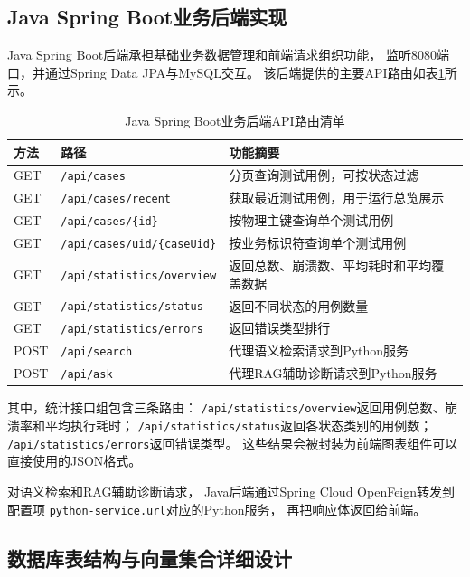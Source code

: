 \subsection{Java Spring Boot业务后端实现}

Java Spring Boot后端承担基础业务数据管理和前端请求组织功能，
监听8080端口，并通过Spring Data JPA与MySQL交互。
该后端提供的主要API路由如表\ref{tab:java_api_routes}所示。

\begin{table}[htbp]
\centering
\setlength{\tabcolsep}{6pt}
\renewcommand{\arraystretch}{1.25}
\caption{Java Spring Boot业务后端API路由清单}
\label{tab:java_api_routes}
\begin{tabular}{llp{7.1cm}}
\toprule
方法 & 路径 & 功能摘要 \\
\midrule
GET & \texttt{/api/cases} & 分页查询测试用例，可按状态过滤 \\
GET & \texttt{/api/cases/recent} & 获取最近测试用例，用于运行总览展示 \\
GET & \texttt{/api/cases/\{id\}} & 按物理主键查询单个测试用例 \\
GET & \texttt{/api/cases/uid/}\allowbreak\texttt{\{caseUid\}} & 按业务标识符查询单个测试用例 \\
GET & \texttt{/api/statistics/}\allowbreak\texttt{overview} & 返回总数、崩溃数、平均耗时和平均覆盖数据 \\
GET & \texttt{/api/statistics/}\allowbreak\texttt{status} & 返回不同状态的用例数量 \\
GET & \texttt{/api/statistics/}\allowbreak\texttt{errors} & 返回错误类型排行 \\
POST & \texttt{/api/search} & 代理语义检索请求到Python服务 \\
POST & \texttt{/api/ask} & 代理RAG辅助诊断请求到Python服务 \\
\bottomrule
\end{tabular}
\end{table}

其中，统计接口组包含三条路由：
\texttt{/api/statistics/overview}返回用例总数、崩溃率和平均执行耗时；
\texttt{/api/statistics/status}返回各状态类别的用例数；
\texttt{/api/statistics/errors}返回错误类型。
这些结果会被封装为前端图表组件可以直接使用的JSON格式。

对语义检索和RAG辅助诊断请求，
Java后端通过Spring Cloud OpenFeign转发到配置项
\texttt{python-service.url}对应的Python服务，
再把响应体返回给前端。

\subsection{数据库表结构与向量集合详细设计}


